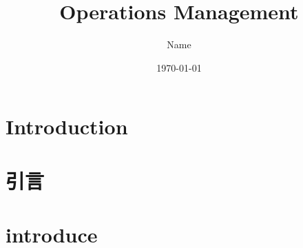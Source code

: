 \documentclass[12pt, letterpaper]{article}
\begin{document}
\title{Operations Management}
\author{Name} %
\date{\today} %
\maketitle %

\section{Introduction} %


 
\newpage
{}%

\begin{CJK*}{UTF8}{bsmi}%

\section{引言}
\section{introduce}

\end{CJK*}
\end{document}
